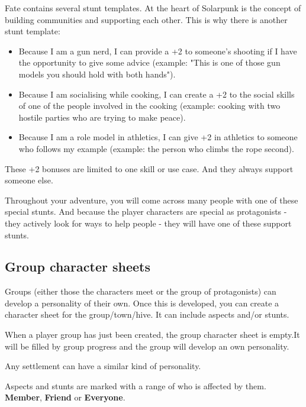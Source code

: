 Fate contains several stunt templates. At the heart of Solarpunk is the concept of building communities and supporting each other. This is why there is another stunt template:

\begin{itemize}
    \item Because I am a gun nerd, I can provide a +2 to someone's shooting if I have the opportunity to give some advice (example: "This is one of those gun models you should hold with both hands").
    \item Because I am socialising while cooking, I can create a +2 to the social skills of one of the people involved in the cooking (example: cooking with two hostile parties who are trying to make peace).
    \item Because I am a role model in athletics, I can give +2 in athletics to someone who follows my example (example: the person who climbs the rope second).
\end{itemize}

These +2 bonuses are limited to one skill or use case. And they always support someone else.

Throughout your adventure, you will come across many people with one of these special stunts. And because the player characters are special as protagonists - they actively look for ways to help people - they will have one of these support stunts.


\subsection{Group character sheets}

Groups (either those the characters meet or the group of protagonists) can develop a personality of their own. Once this is developed, you can create a character sheet for the group/town/hive. It can include aspects and/or stunts.

When a player group has just been created, the group character sheet is empty.It will be filled by group progress and the group will develop an own personality.

Any settlement can have a similar kind of personality.

Aspects and stunts are marked with a range of who is affected by them. \textbf{Member}, \textbf{Friend} or \textbf{Everyone}.

